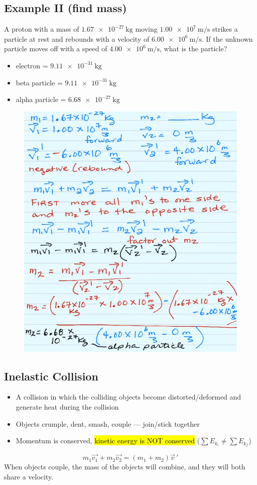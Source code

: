 \documentclass[a4paper,12pt]{article}
\begin{document}
\subsection{Example II (find mass)}
A proton with a mass of $\SI{1.67e-27}{\kg}$ moving $\SI{1.00e7}{\m/\s}$ strikes a particle at rest and rebounds with a velocity of $\SI{6.00e6}{\m/\s}$. If the unknown particle moves off with a speed of $\SI{4.00e6}{\m/\s}$, what is the particle?
\begin{itemize}
    \item{electron = $\SI{9.11e-31}{\kg}$}
    \item{beta particle = $\SI{9.11e-31}{\kg}$}
    \item{alpha particle = $\SI{6.68e-27}{\kg}$}
\end{itemize}

\begin{figure}[H]
    \centering
    \includegraphics[width=\textwidth]{q-elastic-2}
\end{figure}

\subsection{Inelastic Collision}
\begin{itemize}
    \item{A collision in which the colliding objects become distorted/deformed and generate heat during the collision}
    \item{Objects crumple, dent, smash, couple --- join/stick together}
    \item{Momentum is conserved, \hl{kinetic energy is NOT conserved} ($\sum E_{k_i} \neq \sum E_{k_f}$)}
\end{itemize}
\Large $$m_1\vec{v_1} + m_2\vec{v_2} = (m_1+m_2)\vec{v}\,'$$ \normalsize
When objects couple, the mass of the objects will combine, and they will both share a velocity.
\end{document}
